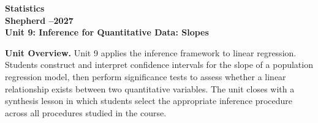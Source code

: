 \documentclass[10pt]{article}
\begin{document}
\vspace{-1.3in}

\begin{center}
  {\color{white}\bfseries\fontsize{24}{30}\selectfont Statistics}\\[5pt]
  {\color{goldacc}\bfseries\large Shepherd --2027}\\[10pt]
  {\color{white}\bfseries\Large Unit 9: Inference for Quantitative Data: Slopes}\\[3pt]
\end{center}

\vspace{0.18in}

\begin{tcolorbox}[colback=sky,colframe=navy,boxrule=0.9pt,arc=2mm,
    left=4mm,right=4mm,top=2mm,bottom=2mm]
  \small\textbf{Unit Overview.}\quad
  Unit 9 applies the inference framework to linear regression.
  Students construct and interpret confidence intervals for the slope of a
  population regression model, then perform significance tests to assess whether a
  linear relationship exists between two quantitative variables.
  The unit closes with a synthesis lesson in which students select the appropriate
  inference procedure across all procedures studied in the course.
\end{tcolorbox}

\vspace{0.14in}
\end{document}
